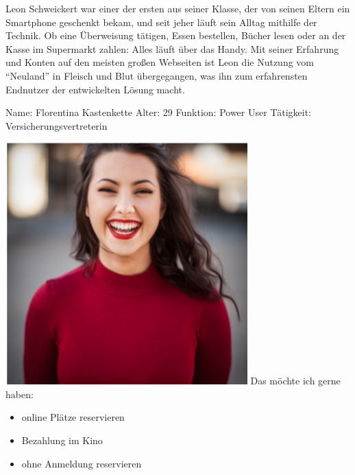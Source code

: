 Leon Schweickert war einer der ersten aus seiner Klasse, der von seinen Eltern ein Smartphone geschenkt bekam, und seit jeher läuft sein Alltag mithilfe der Technik. Ob eine Überweisung tätigen, Essen bestellen, Bücher lesen oder an der Kasse im Supermarkt zahlen: Alles läuft über das Handy. Mit seiner Erfahrung und Konten auf den meisten großen Webseiten ist Leon die Nutzung vom \enquote{Neuland} in Fleisch und Blut übergegangen, was ihn zum erfahrensten Endnutzer der entwickelten Lösung macht.

\newpage
{}
\begin{minipage}[t]{0.5\textwidth} 	\vspace{0.2\baselineskip} %
	\begin{entrylist}
		\entry
		{Name:}
		{Florentina Kastenkette}
		\entry
		{Alter:}
		{29}
		\entry
		{Funktion:}
		{Power User}
		\entry
		{Tätigkeit:}
		{Versicherungsvertreterin}
	\end{entrylist}
	\begin{barchart}{5.0}\hspace{-1.5mm}
	\end{barchart}
\end{minipage}
\hfil
\begin{minipage}[t]{0.4\textwidth} 	\vspace{0.0\baselineskip} %
	\flushright
	\includegraphics[width=0.70\textwidth]{img/florentina}
	\vspace{-0.2cm}
	\flushleft
	Das möchte ich gerne haben:
	\begin{itemize}
		\item online Plätze reservieren
		\item Bezahlung im Kino
		\item ohne Anmeldung reservieren
	\end{itemize}
\end{minipage}

